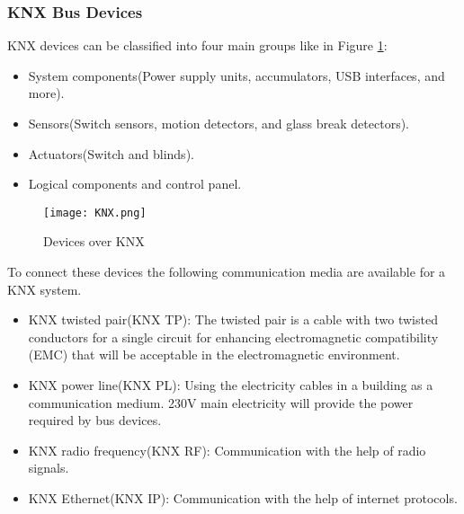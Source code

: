 \documentclass{article}
\begin{document}
\subsubsection{KNX Bus Devices}
KNX devices can be classified into four main groups like in Figure \ref{fig:knx}\cite{Automation}: 
\begin{itemize}
    \item System components(Power supply units, accumulators, USB interfaces, and more).
    \item Sensors(Switch sensors, motion detectors, and glass break detectors).
    \item Actuators(Switch and blinds).
    \item Logical components and control panel. 
\end{itemize}  
\begin{figure}[h!]
    \centering
    \texttt{[image: KNX.png]}
    \caption{Devices over KNX}
    \label{fig:knx}
\end{figure}
To connect these devices the following communication media are available for a KNX system.\cite{KNXBasic} 
\begin{itemize}
    \item KNX twisted pair(KNX TP): The twisted pair is a cable with two twisted conductors for a single circuit 
    for enhancing electromagnetic compatibility (EMC) that will be acceptable
    in the electromagnetic environment.\cite{fdaEMC}
    \item KNX power line(KNX PL): Using the electricity cables in a building as a communication medium. 230V main electricity will provide the power required by bus devices.
    \item KNX radio frequency(KNX RF): Communication with the help of radio signals.
    \item KNX Ethernet(KNX IP): Communication with the help of internet protocols.
\end{itemize}
\newpage
\end{document}
